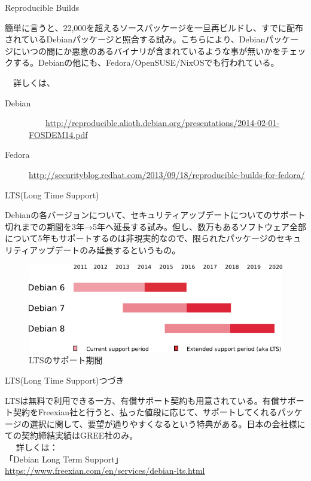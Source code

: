 \begin{frame}{Reproducible Builds}

 簡単に言うと、22,000を超えるソースパッケージを一旦再ビルドし、すでに配布されているDebianパッケージと照合する試み。こちらにより、Debianパッケージにいつの間にか悪意のあるバイナリが含まれているような事が無いかをチェックする。Debianの他にも、Fedora/OpenSUSE/NixOSでも行われている。

 　詳しくは、
 \begin{description}
\item [Debian]
　　\url{http://reproducible.alioth.debian.org/presentations/2014-02-01-FOSDEM14.pdf}

\item [Fedora]
   \url{http://securityblog.redhat.com/2013/09/18/reproducible-builds-for-fedora/}

 \end{description}
\end{frame}
   
\begin{frame}{LTS(Long Time Support)}

  Debianの各バージョンについて、セキュリティアップデートについてのサポート切れまでの期間を3年→5年へ延長する試み。但し、数万もあるソフトウェア全部について5年もサポートするのは非現実的なので、限られたパッケージのセキュリティアップデートのみ延長するというもの。
\begin{figure}[H]
\begin{center}
 \includegraphics[width=0.7\hsize]{image201506/debian-lts-periods.png}
\end{center}
\caption{LTSのサポート期間}
\end{figure}

\end{frame}

\begin{frame}{LTS(Long Time Support)つづき}

 LTSは無料で利用できる一方、有償サポート契約も用意されている。有償サポート契約をFreexian社と行うと、払った値段に応じて、サポートしてくれるパッケージの選択に関して、要望が通りやすくなるという特典がある。日本の会社様にての契約締結実績はGREE社のみ。
\ \\　
詳しくは：\\
「Debian Long Term Support」\\
\url{https://www.freexian.com/en/services/debian-lts.html}

\end{frame}

